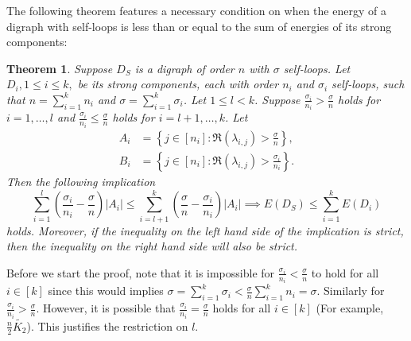 \documentclass[12pt,a4paper,reqno]{amsart}
\numberwithin{equation}{section}
\theoremstyle{plain}
\newtheorem{theorem}{Theorem}[section]
\theoremstyle{definition}
\newcommand{\<}{\langle}
\renewcommand{\>}{\rangle}
\begin{document}
The following theorem features a necessary condition on when the energy of a digraph with self-loops is less than or equal to the sum of energies of its strong components:

\begin{theorem}\label{suffcond1}
	Suppose $D_S$ is a digraph of order $n$ with $\sigma$ self-loops. Let $D_i, 1 \leq i \leq k,$ be its strong components, each with order $n_i$ and $\sigma_i$ self-loops, such that $n=\sum_{i=1}^k n_i$ and $\sigma=\sum_{i=1}^k \sigma_i$. Let $1\leq l <k$. Suppose $\frac{\sigma_i}{n_i} > \frac{\sigma}{n}$ holds for $i=1, \ldots, l$ and $\frac{\sigma_i}{n_i} \leq \frac{\sigma}{n}$ holds for $i=l+1, \ldots, k$. Let 
	\begin{align*}
	A_i &=\left\{ j\in[n_i] :      \Re(\lambda_{i,j})> \frac{\sigma}{n}\right\}, \\
        B_i &=\left\{ j\in[n_i] : \Re(\lambda_{i,j})> \frac{\sigma_i}{n_i} \right\}.
	\end{align*}  
    Then the following implication
    \begin{equation*}
        \sum_{i=1}^l \left( \frac{\sigma_i}{n_i}-\frac{\sigma}{n}\right) |A_i| \leq \sum_{i=l+1}^k \left( \frac{\sigma}{n}-\frac{\sigma_i}{n_i} \right)|A_i| \implies E(D_S) \leq \sum_{i=1}^k E(D_i)
    \end{equation*}
    holds. Moreover, if the inequality on the left hand side of the implication is strict, then the inequality on the right hand side will also be strict.
\end{theorem}

    Before we start the proof, note that it is impossible for $\frac{\sigma_i}{n_i} < \frac{\sigma}{n}$ to hold for all $i\in [k]$ since this would implies $\sigma=\sum_{i=1}^k \sigma_i < \frac{\sigma}{n}  \sum_{i=1}^k n_i= \sigma$.
	Similarly for $\frac{\sigma_i}{n_i} > \frac{\sigma}{n}$. However, it is possible that $\frac{\sigma_i}{n_i} = \frac{\sigma}{n}$ holds for all $i \in [k]$ (For example, $\frac{n}{2} \widetilde{K_2}$). This justifies the restriction on $l$.
\end{document}
